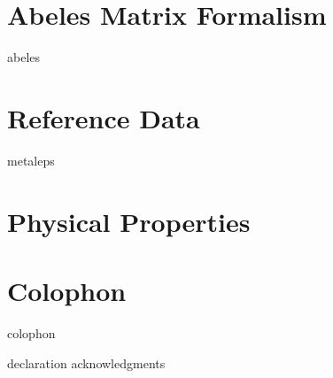 \documentclass[12pt,a4paper,titlepage,onecolumn]{report}
\begin{document}
\section{Abeles Matrix Formalism}\label{ch:abeles}
{abeles}
\section{Reference Data}\label{ch:reference}
{metaleps}
\section{Physical Properties}
\label{ref:physicalproperties}
\section{Colophon}
{colophon}




{declaration}
{acknowledgments}
\end{document}
